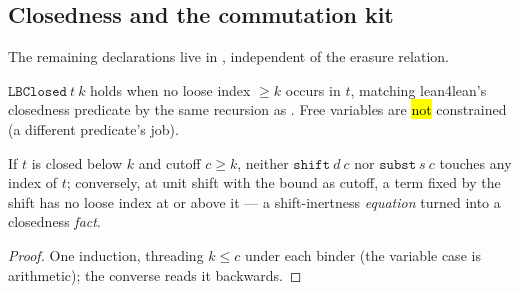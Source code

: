 \subsection*{Closedness and the commutation kit}

The remaining declarations live in , independent of the erasure relation.

\begin{definition}
\label{def:LBClosed}
\leanok
{}
 $\mathtt{LBClosed}\ t\ k$ holds when no loose index $\ge k$ occurs in $t$, matching lean4lean's closedness predicate by the same recursion as . Free variables are \hl{not} constrained (a different predicate's job).
\end{definition}

\begin{lemma}
\label{lem:LBClosed-shift_eq}
\leanok
{}
 If $t$ is closed below $k$ and cutoff $c \ge k$, neither $\mathtt{shift}\ d\ c$ nor $\mathtt{subst}\ s\ c$ touches any index of $t$; conversely, at unit shift with the bound as cutoff, a term fixed by the shift has no loose index at or above it --- a shift-inertness \emph{equation} turned into a closedness \emph{fact}.
\end{lemma}
\begin{proof}
\leanok
{}
 One  induction, threading $k \le c$ under each binder (the variable case is arithmetic); the converse reads it backwards.
\end{proof}

